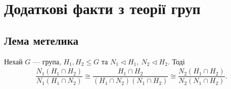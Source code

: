 \documentclass{math_library}
\begin{document}
\section{Додаткові факти з теорії груп}
\subsection{Лема метелика}
\begin{lemma}
Нехай $G$ --- група, $H_1,H_2 \leq G$ та $N_1 \triangleleft H_1,\ N_2 \triangleleft H_2$. Тоді
\begin{align*}
\dfrac{N_1 (H_1 \cap H_2)}{N_1(H_1 \cap N_2)} \cong \dfrac{H_1 \cap H_2}{(H_1 \cap N_2) (N_1 \cap H_2)} \cong \dfrac{N_2(H_1 \cap H_2)}{N_2(N_1 \cap H_2)}.
\end{align*}
\end{lemma}
\end{document}
